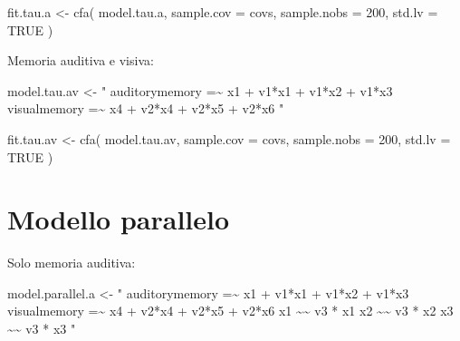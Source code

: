 \documentclass[
  11pt,
]{krantz}
\makeatletter
\newenvironment{Shaded}{\begin{snugshade}}{\end{snugshade}}
\newcommand{\AttributeTok}[1]{\textcolor[rgb]{0.61,0.61,0.61}{#1}}
\newcommand{\ConstantTok}[1]{\textcolor[rgb]{0,0,0}{#1}}
\newcommand{\DecValTok}[1]{\textcolor[rgb]{0.06,0.06,0.06}{#1}}
\newcommand{\FunctionTok}[1]{\textcolor[rgb]{0,0,0}{#1}}
\newcommand{\NormalTok}[1]{#1}
\newcommand{\OtherTok}[1]{\textcolor[rgb]{0.37,0.37,0.37}{#1}}
\newcommand{\StringTok}[1]{\textcolor[rgb]{0.5,0.5,0.5}{#1}}
\newenvironment{kframe}{%
\medskip{}
\setlength{\fboxsep}{.8em}
 \def\at@end@of@kframe{}%
 \ifinner\ifhmode%
  \def\at@end@of@kframe{\end{minipage}}%
  \begin{minipage}{\columnwidth}%
 \fi\fi%
 \def\FrameCommand##1{\hskip\@totalleftmargin \hskip-\fboxsep
 \colorbox{shadecolor}{##1}\hskip-\fboxsep
     \hskip-\linewidth \hskip-\@totalleftmargin \hskip\columnwidth}%
 \MakeFramed {\advance\hsize-\width
   \@totalleftmargin\z@ \linewidth\hsize
   \@setminipage}}%
 {\par\unskip\endMakeFramed%
 \at@end@of@kframe}
\renewenvironment{Shaded}{\begin{kframe}}{\end{kframe}}
\theoremstyle{definition}
\theoremstyle{definition}
\theoremstyle{definition}
\theoremstyle{definition}
\theoremstyle{remark}
\makeatother
\begin{document}
\begin{Shaded}
\begin{Highlighting}[]
\NormalTok{fit.tau.a }\OtherTok{\textless{}{-}} \FunctionTok{cfa}\NormalTok{(}
\NormalTok{  model.tau.a,}
  \AttributeTok{sample.cov =}\NormalTok{ covs,}
  \AttributeTok{sample.nobs =} \DecValTok{200}\NormalTok{,}
  \AttributeTok{std.lv =} \ConstantTok{TRUE}
\NormalTok{)}
\end{Highlighting}
\end{Shaded}

Memoria auditiva e visiva:

\begin{Shaded}
\begin{Highlighting}[]
\NormalTok{model.tau.av }\OtherTok{\textless{}{-}} \StringTok{"}
\StringTok{  auditorymemory =\textasciitilde{} x1 + v1*x1 + v1*x2 + v1*x3}
\StringTok{  visualmemory   =\textasciitilde{} x4 + v2*x4 + v2*x5 + v2*x6}
\StringTok{"}
\end{Highlighting}
\end{Shaded}

\begin{Shaded}
\begin{Highlighting}[]
\NormalTok{fit.tau.av }\OtherTok{\textless{}{-}} \FunctionTok{cfa}\NormalTok{(}
\NormalTok{  model.tau.av,}
  \AttributeTok{sample.cov =}\NormalTok{ covs,}
  \AttributeTok{sample.nobs =} \DecValTok{200}\NormalTok{,}
  \AttributeTok{std.lv =} \ConstantTok{TRUE}
\NormalTok{)}
\end{Highlighting}
\end{Shaded}

\hypertarget{modello-parallelo}{%
\section{Modello parallelo}\label{modello-parallelo}}

Solo memoria auditiva:

\begin{Shaded}
\begin{Highlighting}[]
\NormalTok{model.parallel.a }\OtherTok{\textless{}{-}} \StringTok{"}
\StringTok{  auditorymemory =\textasciitilde{} x1 + v1*x1 + v1*x2 + v1*x3}
\StringTok{  visualmemory   =\textasciitilde{} x4 + v2*x4 + v2*x5 + v2*x6}
\StringTok{  x1 \textasciitilde{}\textasciitilde{} v3 * x1}
\StringTok{  x2 \textasciitilde{}\textasciitilde{} v3 * x2}
\StringTok{  x3 \textasciitilde{}\textasciitilde{} v3 * x3}
\StringTok{"}
\end{Highlighting}
\end{Shaded}
\end{document}
